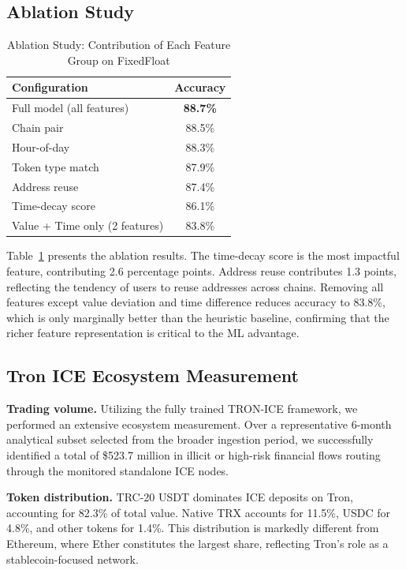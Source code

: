 \documentclass[journal]{IEEEtran}
\begin{document}
    \subsection{Ablation Study}
    
    \begin{table}[htbp]
    \centering
    \caption{Ablation Study: Contribution of Each Feature Group on FixedFloat}
    \label{tab:ablation_fixedfloat}
    \begin{tabular}{lc}
    \toprule
    \textbf{Configuration} & \textbf{Accuracy} \\
    \midrule
    Full model (all features) & \textbf{88.7\%} \\
    Chain pair & 88.5\% \\
    Hour-of-day & 88.3\% \\
    Token type match & 87.9\% \\
    Address reuse & 87.4\% \\
    Time-decay score & 86.1\% \\
    Value + Time only (2 features) & 83.8\% \\
    \bottomrule
    \end{tabular}
    \end{table}
    
    Table~\ref{tab:ablation_fixedfloat} presents the ablation results. The time-decay score is the most impactful feature, contributing 2.6 percentage points. Address reuse contributes 1.3 points, reflecting the tendency of users to reuse addresses across chains. Removing all features except value deviation and time difference reduces accuracy to 83.8\%, which is only marginally better than the heuristic baseline, confirming that the richer feature representation is critical to the ML advantage.
    
    \subsection{Tron ICE Ecosystem Measurement}
    
    \textbf{Trading volume.} Utilizing the fully trained TRON-ICE framework, we performed an extensive ecosystem measurement. Over a representative 6-month analytical subset selected from the broader ingestion period, we successfully identified a total of \$523.7 million in illicit or high-risk financial flows routing through the monitored standalone ICE nodes.
    
    \textbf{Token distribution.} TRC-20 USDT dominates ICE deposits on Tron, accounting for 82.3\% of total value. Native TRX accounts for 11.5\%, USDC for 4.8\%, and other tokens for 1.4\%. This distribution is markedly different from Ethereum, where Ether constitutes the largest share, reflecting Tron's role as a stablecoin-focused network.
    
\end{document}
